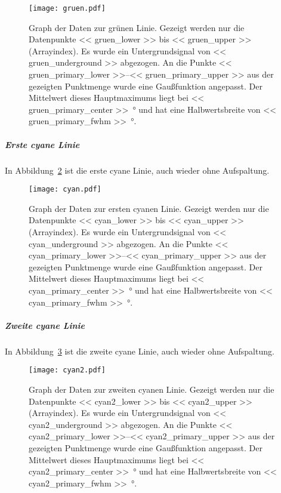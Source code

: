 \begin{figure}[htbp]
    \centering
    \texttt{[image: gruen.pdf]}
    \caption{%
        Graph der Daten zur grünen Linie. Gezeigt werden nur die Datenpunkte
        \num{<< gruen_lower >>} bis \num{<< gruen_upper >>} (Arrayindex). Es
        wurde ein Untergrundsignal von \num{<< gruen_underground >>} abgezogen.  An die
        Punkte \numrange{<< gruen_primary_lower >>}{<< gruen_primary_upper >>} aus
        der gezeigten Punktmenge wurde eine Gaußfunktion angepasst. Der
        Mittelwert dieses Hauptmaximums liegt bei \SI{<< gruen_primary_center
        >>}{\degree} und hat eine Halbwertsbreite von \SI{<< gruen_primary_fwhm
        >>}{\degree}.
    }
    \label{fig:gruen}
\end{figure}

\subparagraph{Erste cyane Linie}

In Abbildung~\ref{fig:cyan} ist die erste cyane Linie, auch wieder ohne
Aufspaltung.

\begin{figure}[htbp]
    \centering
    \texttt{[image: cyan.pdf]}
    \caption{%
        Graph der Daten zur ersten cyanen Linie. Gezeigt werden nur die
        Datenpunkte \num{<< cyan_lower >>} bis \num{<< cyan_upper >>}
        (Arrayindex). Es wurde ein Untergrundsignal von \num{<< cyan_underground
        >>} abgezogen. An die Punkte \numrange{<< cyan_primary_lower >>}{<<
        cyan_primary_upper >>} aus der gezeigten Punktmenge wurde eine
        Gaußfunktion angepasst. Der Mittelwert dieses Hauptmaximums liegt bei
        \SI{<< cyan_primary_center >>}{\degree} und hat eine Halbwertsbreite von
        \SI{<< cyan_primary_fwhm >>}{\degree}.
    }
    \label{fig:cyan}
\end{figure}

\subparagraph{Zweite cyane Linie}

In Abbildung~\ref{fig:cyan2} ist die zweite cyane Linie, auch wieder ohne
Aufspaltung.

\begin{figure}[htbp]
    \centering
    \texttt{[image: cyan2.pdf]}
    \caption{%
        Graph der Daten zur zweiten cyanen Linie. Gezeigt werden nur die
        Datenpunkte \num{<< cyan2_lower >>} bis \num{<< cyan2_upper >>}
        (Arrayindex). Es wurde ein Untergrundsignal von \num{<< cyan2_underground
        >>} abgezogen. An die Punkte \numrange{<< cyan2_primary_lower >>}{<<
        cyan2_primary_upper >>} aus der gezeigten Punktmenge wurde eine
        Gaußfunktion angepasst. Der Mittelwert dieses Hauptmaximums liegt bei
        \SI{<< cyan2_primary_center >>}{\degree} und hat eine Halbwertsbreite von
        \SI{<< cyan2_primary_fwhm >>}{\degree}.
    }
    \label{fig:cyan2}
\end{figure}

